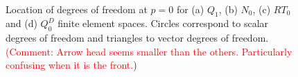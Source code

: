 \documentclass[times]{elsarticle}
\begin{document}
\begin{figure}
\centering
{}%
\\
%
%
\caption{\label{fig:fem-spaces} Location of degrees of freedom at $p=0$ for 
(a) $Q_{1}$, (b) $N_0$, (c) $RT_0$ and (d) $Q_0^D$ finite element spaces.
Circles correspond to scalar degrees of freedom and triangles to vector degrees
of freedom.
\textcolor{red}{(Comment: Arrow head seems smaller than the others. Particularly confusing when it is the front.})
}
\end{figure}
\end{document}
